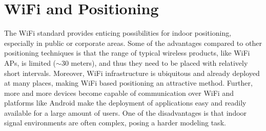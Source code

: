 \documentclass{LTHthesis}
\begin{document}
\section{WiFi and Positioning}
\label{sec:wifi_positioning}
%
The WiFi standard provides enticing possibilities for indoor positioning, especially in public or corporate areas. Some of the advantages compared to other positioning techniques is that the range of typical wireless products, like WiFi APs, is limited ($\sim 30$ meters), and thus they need to be placed with relatively short intervals. Moreover, WiFi infrastructure is ubiquitous and already deployed at many places, making WiFi based positioning an attractive method. Further, more and more devices become capable of communication over WiFi and platforms like Android make the deployment of applications easy and readily available for a large amount of users. One of the disadvantages is that indoor signal environments are often complex, posing a harder modeling task.
\end{document}
